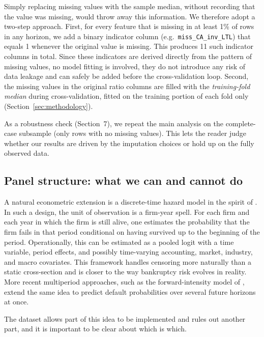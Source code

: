 \documentclass[12pt,a4paper]{article}
\begin{document}
Simply replacing missing values with the sample median, without recording
that the value was missing, would throw away this information. We therefore adopt a two-step approach. First, for every
feature that is missing in at least 1\% of rows in any horizon, we add a
binary indicator column (e.g.\ \texttt{miss\_CA\_inv\_LTL}) that equals 1
whenever the original value is missing. This produces 11 such indicator
columns in total. Since these indicators are derived directly from the
pattern of missing values, no model fitting is involved, they do not
introduce any risk of data leakage and can safely be added before the
cross-validation loop. Second, the missing values in the original ratio
columns are filled with the \textit{training-fold median} during
cross-validation, fitted on the training portion of each fold only
(Section~\ref{sec:methodology}).

As a robustness check (Section~7), we repeat the main analysis on the
complete-case subsample (only rows with no missing values). This lets the
reader judge whether our results are driven by the imputation choices or
hold up on the fully observed data.

\subsection{Panel structure: what we can and cannot do}
\label{sec:panel-limits}

A natural econometric extension is a discrete-time hazard model in the spirit
of \cite{shumway2001}. In such a design, the unit of observation is a
firm-year spell. For each firm and each year in which the firm is still alive,
one estimates the probability that the firm fails in that period conditional
on having survived up to the beginning of the period. Operationally, this can
be estimated as a pooled logit with a time variable, period effects, and
possibly time-varying accounting, market, industry, and macro covariates. This
framework handles censoring more naturally than a static cross-section and is
closer to the way bankruptcy risk evolves in reality. More recent multiperiod
approaches, such as the forward-intensity model of \cite{duan2012}, extend the
same idea to predict default probabilities over several future horizons at
once.

The dataset allows part of this idea to be implemented and rules out another
part, and it is important to be clear about which is which.
\end{document}
